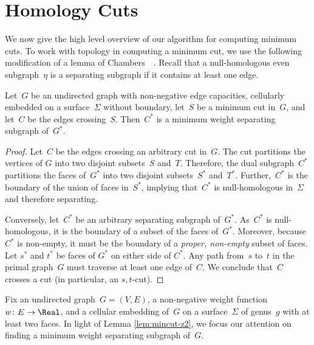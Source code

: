 
\section{Homology Cuts}
\label{sec:global-cut_homology}

We now give the high level overview of our algorithm for computing minimum cuts. To work with topology in computing a minimum cut, we use the following modification of a lemma of Chambers~\etal~\cite[Lemma~3.1]{cen-mcshc-09}.
Recall that a null-homologous even subgraph~$\eta$ is a separating subgraph if it contains at least one edge.

\begin{lemma}
\label{lem:mincut-z2}
Let~$G$ be an undirected graph with non-negative edge capacities, cellularly embedded on a surface~$\Sigma$ without boundary, let~$S$ be a minimum cut in~$G$, and let~$C$ be the edges crossing~$S$.  Then~$C^*$ is a minimum weight separating subgraph of~$G^*$.
\end{lemma}

\begin{proof}
  Let~$C$ be the edges crossing an arbitrary cut in~$G$.  The cut partitions the vertices of $G$
  into two disjoint subsets~$S$ and~$T$. Therefore, the dual subgraph~$C^*$
  partitions the faces of~$G^*$ into two disjoint subsets~$S^*$ and~$T^*$.
  Further,~$C^*$ is the boundary of the union of faces in~$S^*$, implying
  that~$C^*$ is null-homologous in~$\Sigma$ and therefore separating.

  Conversely, let~$C^*$ be an arbitrary separating subgraph of~$G^*$.
  As~$C^*$ is null-homologous, it is the boundary of a subset of the faces
  of~$G^*$.  Moreover, because $C^*$ is non-empty, it must be the boundary of
  a \emph{proper, non-empty} subset of faces.  Let $s^*$ and $t^*$ be faces
  of $G^*$ on either side of $C^*$.  Any path from~$s$ to~$t$ in the primal
  graph~$G$ must traverse at least one edge of~$C$.  We conclude that~$C$ crosses
  a cut (in particular, an $s,t$-cut).
\end{proof}

Fix an undirected graph~$G=(V,E)$, a non-negative weight function ${w\colon E\to \Real}$, and a cellular embedding of~$G$ on a surface~$\Sigma$ of genus~$g$ with at least two faces.  In light of Lemma \ref{lem:mincut-z2}, we focus our attention on finding a minimum weight separating subgraph of~$G$. 


